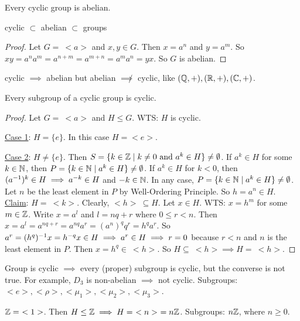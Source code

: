 \documentclass[]{article}
\begin{document}
\newpage
\begin{proposition}
	Every cyclic group is abelian.
\end{proposition}
\begin{note}
	cyclic $\subset$ abelian $\subset$ groups
\end{note}
\begin{proof}
	Let $G =\ <a>$ and $x,y\in G$. Then $x = a^n$ and $y = a^m$. So $xy = a^na^m = a^{n+m} = a^{m+n} = a^ma^n = yx$. So $G$ is abelian.
\end{proof}
\begin{remark}
	cyclic $\implies$ abelian but abelian $\not\implies$ cyclic, like $(\mathbb{Q},+),(\mathbb{R},+), (\mathbb{C},+)$.
\end{remark}

\begin{theorem}
	Every subgroup of a cyclic group is cyclic.
\end{theorem}
\begin{proof}
	Let $G =\ <a>$ and $H\leq G$.
	WTS: $H$ is cyclic.
	
	\ul{Case 1}: $H = \{e\}$. In this case $H = <e>$.

	\ul{Case 2}: $H\neq \{e\}$.
	Then $S = \{k\in \mathbb{Z}\mid k \neq 0 \text{ and } a^k\in H\}\neq \emptyset$.
	If $a^k\in H$ for some $k\in\mathbb{N}$, then $P = \{k\in\mathbb{N}\mid a^k\in H\}\neq\emptyset$.
	If $a^k\in H$ for $k<0$, then $(a^{-1})^k\in H\implies a^{-k}\in H$ and $-k\in\mathbb{N}$.
	In any case, $P = \{k\in\mathbb{N}\mid a^k\in H\}\neq \emptyset$.
	Let $n$ be the least element in $P$ by Well-Ordering Principle.
	So $h = a^n\in H$. \ul{Claim}: $H =\ <k>$.
	Clearly, $<h>\ \subseteq H$. Let $x\in H$. WTS: $x = h^m$ for some $m\in\mathbb{Z}$.
	Write $x = a^l$ and $l = nq + r$ where $0\leq r<n$. Then $x = a^l = a^{nq+r} = a^{nq} a^r = (a^n)^qq^r = h^qa^r$. So $a^r = (h^q)^{-1} x = h^{-q}x\in H \implies a^r\in H \implies r = 0$ because $r<n$ and $n$ is the least element in $P$.
	Then $x = h^q \in\ <h>$. So $H\subseteq\ <h> \implies H =\ <h>$.
\end{proof}

Group is cyclic $\implies$ every (proper) subgroup is cyclic, but the converse is not true. For example, $D_3$ is non-abelian $\implies$ not cyclic. Subgroups: $<e>,<\rho>,<\mu_1>,<\mu_2>,<\mu_3>$.

\begin{example}
	$\mathbb{Z} =\ <1>$. Then $H\leq \mathbb{Z} \implies H =\ <n>\ = n\mathbb{Z}$. Subgroups: $n\mathbb{Z}$, where $n\geq 0$.
\end{example}
\end{document}
